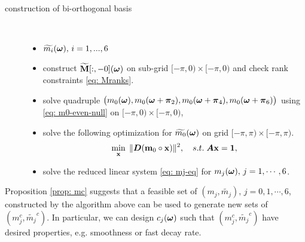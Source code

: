 \begin{description}%
\item[construction of bi-orthogonal basis]\
\begin{itemize}
\item[Input:] $\widetilde{m_{i}}(\boldsymbol{\omega}),\,i=1,...,6$
\item[1.] construct $\widetilde{\mathbf{M}}[:,-0](\boldsymbol{\omega})$ on sub-grid $[-\pi,0)\times[-\pi,0)$ and check rank constraints \eqref{eq: Mranks}.%
\item[2.] solve quadruple $\big( m_0(\boldsymbol{\omega}),m_0(\boldsymbol{\omega}+\boldsymbol{\pi}_2), m_0(\boldsymbol{\omega} +\boldsymbol{\pi}_4), m_0(\boldsymbol{\omega}+\boldsymbol{\pi}_6) \big)$ using \eqref{eq: m0-even-null} on $[-\pi,0)\times[-\pi,0)$,%
\item[3.] solve the following optimization for $\widetilde{m_{0}}(\boldsymbol{\omega})$ on grid $[-\pi,\pi)\times[-\pi,\pi)$.
\begin{align}\label{eq: opt}
\min_{\mathbf{x}}\; \Vert \boldsymbol{D}(\mathbf{m}_0\circ\mathbf{x})\Vert^2,\quad 
s.t. \; \boldsymbol{A}\mathbf{x} = \mathbf{1},
\end{align}
\item[4.] solve the reduced linear system \eqref{eq: mj-eq} for $m_j(\boldsymbol{\omega}),\, j = 1,\cdots,6$.%
\end{itemize}
\end{description}
Proposition \ref{prop: mc} suggests that a feasible set of $(m_j,\widetilde{m_j}), \, j = 0,1,\cdots,6$, constructed by the algorithm above can be used to generate new sets of $(m_j^c,\widetilde{m_j}^c)$. In particular, we can design $c_j(\boldsymbol{\omega})$ such that $(m_j^c,\widetilde{m_j}^c)$ have desired properties, e.g. smoothness or fast decay rate.

\begin{comment}
\subsection{solving $m_i$}
In the final step, we substitute $\mc{0}$ and $m_0^C(\V{\omega})$ into \eqref{eq: LS-new} and rewrite it into the following linear system,
\begin{align}\label{eq: mi}
\overline{\M}[:,2:7]\,\mathbf{m}[2:7](\V{\omega}) = 
\begin{bmatrix}
1-m_0^C\overline{\widetilde{m_0}^C}(\V{\omega})\\
0\\
-m_0^C\overline{\widetilde{m_0}^C}(\V{\omega}+\V{\pi}_2)\\
\vdots \\
0
\end{bmatrix}
=:\mathbf{b}(\V{\omega}).
\end{align}
The solution of \eqref{eq: mi} depends only on $m_0^C\overline{\widetilde{m_0}^C}$, or equivalently $m_0\overline{\widetilde{m_0}}$. 
\end{comment}

